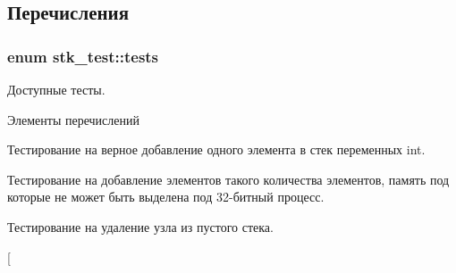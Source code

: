 \subsection{Перечисления}
\hypertarget{namespacestk__test_aee7ec7a767abf7b0b65ce9a2afb7de78}{}
\subsubsection[{tests}]{\setlength{\rightskip}{0pt plus 5cm}enum {\bf stk\+\_\+test\+::tests}}\label{namespacestk__test_aee7ec7a767abf7b0b65ce9a2afb7de78}


Доступные тесты. 

\begin{Desc}
\item[Элементы перечислений]\par
\begin{description}
\item[{\em 
\hypertarget{namespacestk__test_aee7ec7a767abf7b0b65ce9a2afb7de78a16992c4d9ecd605ea8503740aee9df96}{}Push\+Single\+Number\label{namespacestk__test_aee7ec7a767abf7b0b65ce9a2afb7de78a16992c4d9ecd605ea8503740aee9df96}
}]Тестирование на верное добавление одного элемента в стек переменных int. \item[{\em 
\hypertarget{namespacestk__test_aee7ec7a767abf7b0b65ce9a2afb7de78a6e2bd84a1d3046f2c01c930a1d52be64}{}Cannot\+Push\+More\label{namespacestk__test_aee7ec7a767abf7b0b65ce9a2afb7de78a6e2bd84a1d3046f2c01c930a1d52be64}
}]Тестирование на добавление элементов такого количества элементов, память под которые не может быть выделена под 32-\/битный процесс. \item[{\em 
\hypertarget{namespacestk__test_aee7ec7a767abf7b0b65ce9a2afb7de78ae9c603d2f7d582fd4fdd5db8140ceecf}{}Pop\+From\+Empty\label{namespacestk__test_aee7ec7a767abf7b0b65ce9a2afb7de78ae9c603d2f7d582fd4fdd5db8140ceecf}
}]Тестирование на удаление узла из пустого стека. \item[{\em 
}
\end{description}
\end{Desc}
